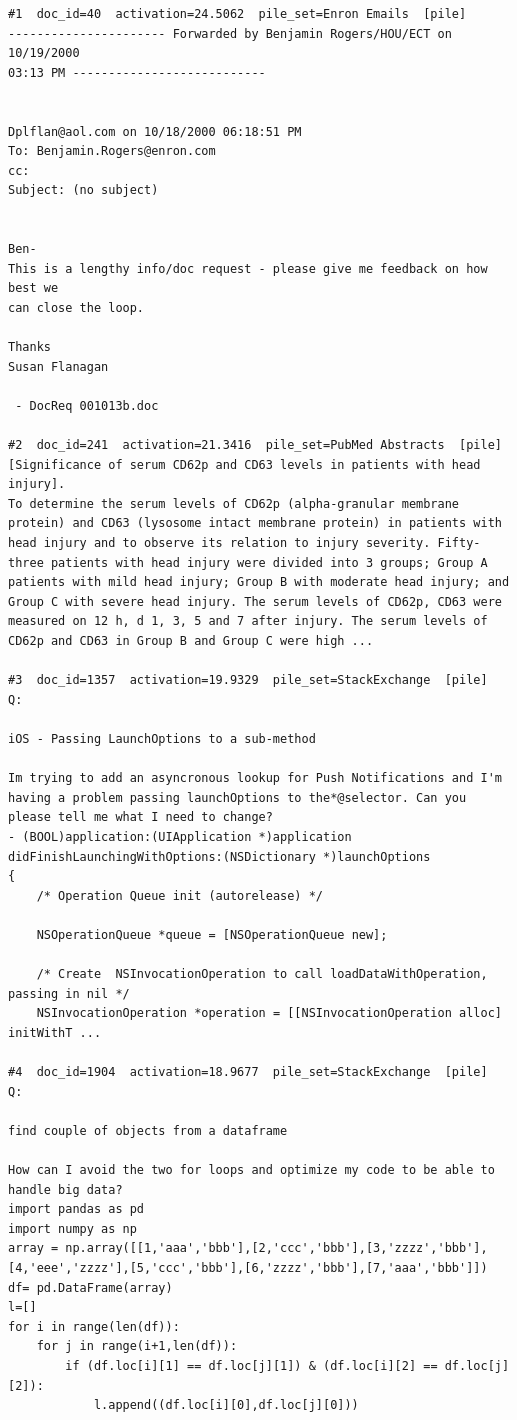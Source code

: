 \begin{verbatim}
#1  doc_id=40  activation=24.5062  pile_set=Enron Emails  [pile]
---------------------- Forwarded by Benjamin Rogers/HOU/ECT on 10/19/2000 
03:13 PM ---------------------------


Dplflan@aol.com on 10/18/2000 06:18:51 PM
To: Benjamin.Rogers@enron.com
cc:  
Subject: (no subject)


Ben-
This is a lengthy info/doc request - please give me feedback on how best we
can close the loop.

Thanks
Susan Flanagan

 - DocReq 001013b.doc

#2  doc_id=241  activation=21.3416  pile_set=PubMed Abstracts  [pile]
[Significance of serum CD62p and CD63 levels in patients with head injury].
To determine the serum levels of CD62p (alpha-granular membrane protein) and CD63 (lysosome intact membrane protein) in patients with head injury and to observe its relation to injury severity. Fifty-three patients with head injury were divided into 3 groups; Group A patients with mild head injury; Group B with moderate head injury; and Group C with severe head injury. The serum levels of CD62p, CD63 were measured on 12 h, d 1, 3, 5 and 7 after injury. The serum levels of CD62p and CD63 in Group B and Group C were high ...

#3  doc_id=1357  activation=19.9329  pile_set=StackExchange  [pile]
Q:

iOS - Passing LaunchOptions to a sub-method

Im trying to add an asyncronous lookup for Push Notifications and I'm having a problem passing launchOptions to the*@selector. Can you please tell me what I need to change?
- (BOOL)application:(UIApplication *)application didFinishLaunchingWithOptions:(NSDictionary *)launchOptions 
{
    /* Operation Queue init (autorelease) */

    NSOperationQueue *queue = [NSOperationQueue new];

    /* Create  NSInvocationOperation to call loadDataWithOperation, passing in nil */
    NSInvocationOperation *operation = [[NSInvocationOperation alloc] initWithT ...

#4  doc_id=1904  activation=18.9677  pile_set=StackExchange  [pile]
Q:

find couple of objects from a dataframe

How can I avoid the two for loops and optimize my code to be able to handle big data?
import pandas as pd 
import numpy as np
array = np.array([[1,'aaa','bbb'],[2,'ccc','bbb'],[3,'zzzz','bbb'],[4,'eee','zzzz'],[5,'ccc','bbb'],[6,'zzzz','bbb'],[7,'aaa','bbb']])
df= pd.DataFrame(array)
l=[]
for i in range(len(df)):
    for j in range(i+1,len(df)):
        if (df.loc[i][1] == df.loc[j][1]) & (df.loc[i][2] == df.loc[j][2]):
            l.append((df.loc[i][0],df.loc[j][0]))


\end{verbatim}
